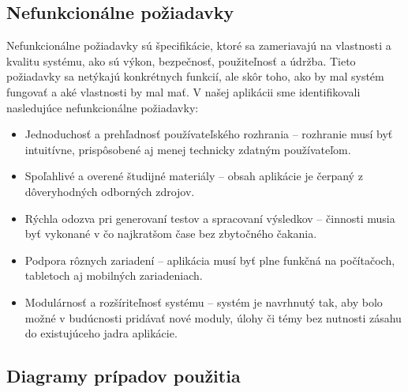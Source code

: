 \subsection{Nefunkcionálne požiadavky}
Nefunkcionálne požiadavky sú špecifikácie, ktoré sa zameriavajú na vlastnosti a kvalitu systému, ako sú výkon, bezpečnosť, použiteľnosť a údržba.
 Tieto požiadavky sa netýkajú konkrétnych funkcií, ale skôr toho, ako by mal systém fungovať a aké vlastnosti by mal mať. 
 V našej aplikácii sme identifikovali nasledujúce nefunkcionálne požiadavky:
 \begin{itemize} 
    \item Jednoduchosť a prehľadnosť používateľského rozhrania – rozhranie musí byť intuitívne, prispôsobené aj menej technicky zdatným používateľom. 
    \item Spoľahlivé a overené študijné materiály – obsah aplikácie je čerpaný z dôveryhodných odborných zdrojov.
    \item Rýchla odozva pri generovaní testov a spracovaní výsledkov – činnosti musia byť vykonané v čo najkratšom čase bez zbytočného čakania.
    \item Podpora rôznych zariadení – aplikácia musí byť plne funkčná na počítačoch, tabletoch aj mobilných zariadeniach. 
    \item Modulárnosť a rozšíriteľnosť systému – systém je navrhnutý tak, aby bolo možné v budúcnosti pridávať nové moduly, úlohy či témy bez nutnosti zásahu do existujúceho jadra aplikácie. 
  \end{itemize}


 \subsection{Diagramy prípadov použitia}
